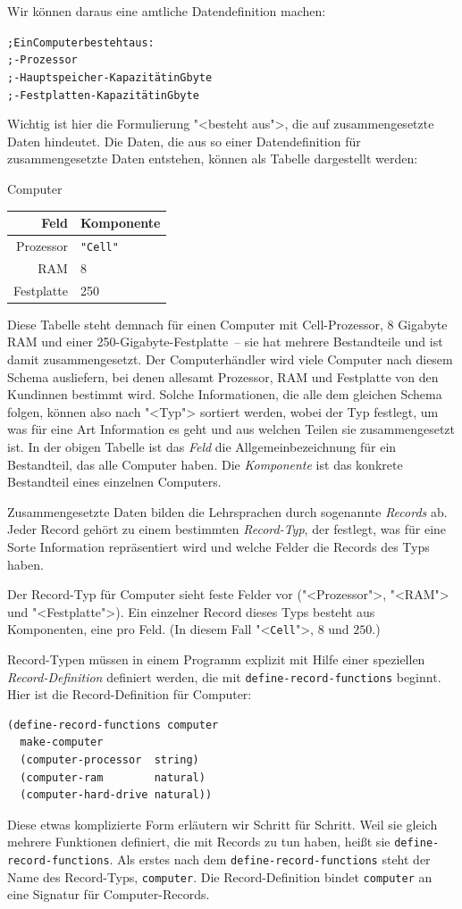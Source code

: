 Wir können daraus eine amtliche Datendefinition machen:
%
\begin{alltt}
; Ein Computer besteht aus:
; - Prozessor
; - Hauptspeicher-Kapazität in Gbyte
; - Festplatten-Kapazität in Gbyte
\end{alltt}
%
Wichtig ist hier die Formulierung "<besteht aus">, die auf
zusammengesetzte Daten hindeutet.  Die Daten, die aus so einer
Datendefinition für zusammengesetzte Daten entstehen, können als
Tabelle dargestellt werden:
%
\begin{center}
  Computer\qquad
  \begin{tabular}[c]{r|l}
    \textbf{Feld} & \textbf{Komponente}\\\hline
     Prozessor & \verb|"Cell"|\\
     RAM & 8\\
    Festplatte & 250
  \end{tabular}
\end{center}
%
Diese Tabelle steht demnach für einen Computer mit Cell-Prozessor, 8
Gigabyte RAM und einer 250-Gigabyte-Festplatte~-- sie hat mehrere
Bestandteile und ist damit zusammengesetzt.  Der Computerhändler wird
viele Computer nach diesem Schema ausliefern, bei denen allesamt
Prozessor, RAM und Festplatte von den Kundinnen bestimmt wird.  Solche
Informationen, die alle dem gleichen Schema folgen, können also nach
"<Typ"> sortiert werden, wobei der Typ
festlegt, um was für eine Art Information es geht und aus welchen
Teilen sie zusammengesetzt ist.  In der obigen Tabelle ist das
\textit{Feld} die Allgemeinbezeichnung für ein Bestandteil, das
alle Computer haben.  Die \textit{Komponente} ist das konkrete
Bestandteil eines einzelnen Computers.

Zusammengesetzte Daten bilden die Lehrsprachen durch
sogenannte \textit{Records} ab.  Jeder Record gehört
zu einem bestimmten
\textit{Record-Typ}, der festlegt, was für eine
Sorte Information repräsentiert wird und welche Felder die Records
des Typs haben.

Der Record-Typ für Computer sieht feste Felder
vor ("<Prozessor">, "<RAM"> und "<Festplatte">).  Ein einzelner Record
dieses Typs besteht aus Komponenten, eine pro
Feld. (In diesem Fall "<\texttt{Cell}">, $8$ und $250$.)

Record-Typen müssen in einem Programm explizit mit Hilfe einer
speziellen \textit{Record-Definition} definiert werden, die mit
\texttt{define-record-functions} beginnt.  Hier ist die
Record-Definition für
Computer:
%
\begin{verbatim}
(define-record-functions computer
  make-computer
  (computer-processor  string)
  (computer-ram        natural)
  (computer-hard-drive natural))
\end{verbatim}
%
Diese etwas komplizierte Form erläutern wir Schritt für Schritt.  Weil sie gleich mehrere
Funktionen definiert, die mit Records zu tun haben, heißt
sie \texttt{define-record-functions}.  Als erstes nach
dem \texttt{define-record-functions} steht der Name des Record-Typs,
\texttt{computer}.  Die Record-Definition bindet \texttt{computer}
an eine Signatur für Computer-Records.

